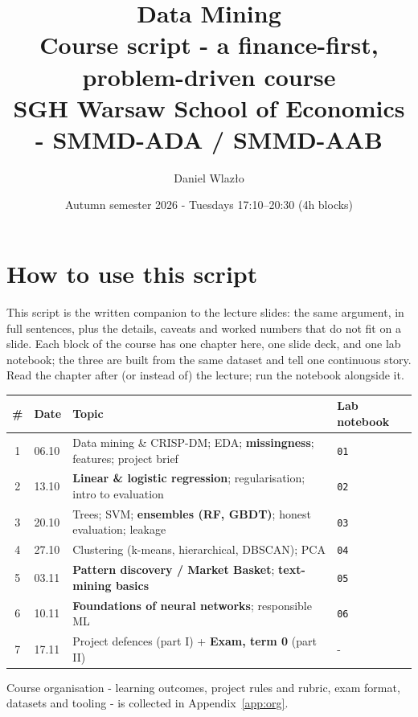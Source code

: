 \documentclass[11pt,a4paper]{article}
\title{\vspace{-1.5cm}\textbf{Data Mining}\\[0.3em]
\large Course script - a finance-first, problem-driven course\\[0.6em]
\normalsize SGH Warsaw School of Economics - SMMD-ADA / SMMD-AAB}
\author{Daniel Wlazło}
\date{Autumn semester 2026 - Tuesdays 17:10--20:30 (4h blocks)}
\begin{document}
\maketitle
\thispagestyle{empty}

\section*{How to use this script}
This script is the written companion to the lecture slides: the same
argument, in full sentences, plus the details, caveats and worked numbers
that do not fit on a slide. Each block of the course has one chapter here,
one slide deck, and one lab notebook; the three are built from the same
dataset and tell one continuous story. Read the chapter after (or instead
of) the lecture; run the notebook alongside it.

\begin{center}\small
\begin{tabular}{@{}clll@{}}
\toprule
\# & Date & Topic & Lab notebook \\
\midrule
1 & 06.10 & Data mining \& CRISP-DM; EDA; \textbf{missingness}; features; project brief & \texttt{01} \\
2 & 13.10 & \textbf{Linear \& logistic regression}; regularisation; intro to evaluation & \texttt{02} \\
3 & 20.10 & Trees; SVM; \textbf{ensembles (RF, GBDT)}; honest evaluation; leakage & \texttt{03} \\
4 & 27.10 & Clustering (k-means, hierarchical, DBSCAN); PCA & \texttt{04} \\
5 & 03.11 & \textbf{Pattern discovery / Market Basket}; \textbf{text-mining basics} & \texttt{05} \\
6 & 10.11 & \textbf{Foundations of neural networks}; responsible ML & \texttt{06} \\
7 & 17.11 & Project defences (part I) + \textbf{Exam, term 0} (part II) & - \\
\bottomrule
\end{tabular}
\end{center}

Course organisation - learning outcomes, project rules and rubric, exam
format, datasets and tooling - is collected in Appendix~\ref{app:org}.

\tableofcontents
\newpage

\end{document}
